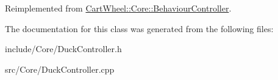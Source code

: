 Reimplemented from \hyperlink{classCartWheel_1_1Core_1_1BehaviourController_a5a0b7293c3693f7a5860ae51bb65164e}{CartWheel::Core::BehaviourController}.



The documentation for this class was generated from the following files:\begin{DoxyCompactItemize}
\item 
include/Core/DuckController.h\item 
src/Core/DuckController.cpp\end{DoxyCompactItemize}
